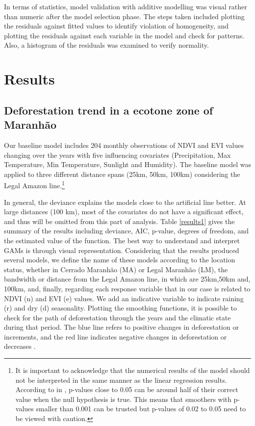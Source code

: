 In terms of statistics, model validation with additive modelling was visual rather than numeric after the model selection phase. The steps taken included plotting the residuals against fitted values to identify violation of homogeneity, and plotting the residuals against each variable in the model and check for patterns. Also, a histogram of the residuals was examined to verify normality. 



\section{Results}  %

\subsection{Deforestation trend in a ecotone zone of Maranhão} \label{resultssection1.2}


Our baseline model includes 204 monthly observations of NDVI and EVI values changing over the years with five influencing covariates (Precipitation, Max Temperature, Min Temperature, Sunlight and Humidity). The baseline model was applied to three different distance spans (25km, 50km, 100km) considering the Legal Amazon line.\footnote{It is important to acknowledge that the numerical results of the model should not be interpreted in the same manner as the linear regression results. According to \citet{Wood_2011} in \citet{zuur_saveliev_ieno_2014}, p-values close to 0.05 can be around half of their correct value when the null hypothesis is true. This means that smoothers with p-values smaller than 0.001 can be trusted but p-values of 0.02 to 0.05 need to be viewed with caution.} 

In general, the deviance explains the models close to the artificial line better. At large distances (100 km), most of the covariates do not have a significant effect, and thus will be omitted from this part of analysis. Table \ref{results1} gives the summary of the results including deviance, AIC, p-value, degrees of freedom, and the estimated value of the function. The best way to understand and interpret GAMs is through visual representation. Considering that the results produced several models, we define the name of these models according to the location status, whether in Cerrado Maranhão (MA) or Legal Maranhão (LM), the bandwidth or distance from the Legal Amazon line, in which are 25km,50km and, 100km, and, finally, regarding each response variable that in our case is related to NDVI (n) and EVI (e) values. We add an indicative variable to indicate raining (r) and dry (d) seasonality. Plotting the smoothing functions, it is possible to check for the path of deforestation through the years and the climatic state during that period. The blue line refers to positive changes in deforestation or increments, and the red line indicates negative changes in deforestation or decreases \citep{Gavin_2018}. 

